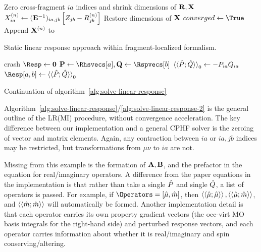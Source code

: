 \documentclass[%
  class = book,%
  crop = false,%
  float = true,%
  multi = true,%
  preview = false,%
]{standalone}
\begin{document}
\begin{algorithm}
\begin{algorithmic}[1]
        \If{\Not{} \AllowCT{}}
          \State Zero cross-fragment \(ia\) indices and shrink dimensions of \(\mathbf{R}, \mathbf{X}\)
        \EndIf
        \State \(X_{ia}^{(n)} \gets (\mathbf{E}^{-1})_{ia,jb} \left[ Z_{jb} - R_{jb}^{(n)} \right]\)
        \If{\Not{} \AllowCT{}}
          \State Restore dimensions of \(\mathbf{X}\)
        \EndIf
          \State \(converged \gets \True\)
          \State Append \(\mathbf{X}^{(n)}\) to \Rspvecs
          \State \Break
        \EndIf
  \end{algorithmic}
  \caption{Static linear response approach within fragment-localized formalism.}
  \label{alg:solve-linear-response}
\end{algorithm}
\begin{algorithm}
  \centering
  \begin{algorithmic}[1]
        \EndFor
        \State crash
      \EndIf
    \EndFor
  \EndFor
  \State \(\Resp \gets \mat{0}\)
      \State \(\mat{P} \gets \Rhsvecs[a], \mat{Q} \gets \Rspvecs[b]\)
      \State \(\braket{\braket{\hat{P}; \hat{Q}}}_{0} \gets -P_{ia}Q_{ia}\)
      \State \(\Resp[a,b] \gets \lr{P}{Q}_{0}\)
    \EndFor
  \EndFor
  \EndProcedure
  \end{algorithmic}
  \caption{Continuation of algorithm~\ref{alg:solve-linear-response}}
  \label{alg:solve-linear-response-2}
\end{algorithm}

Algorithm~\ref{alg:solve-linear-response}/\ref{alg:solve-linear-response-2} is the general outline of the LR(MI) procedure, without convergence acceleration. The key difference between our implementation and a general CPHF solver is the zeroing of vector and matrix elements. Again, any contraction between \(ia\) or \(ia,jb\) indices may be restricted, but transformations from \(\mu\nu\) to \(ia\) are not.

Missing from this example is the formation of \(\mathbf{A}, \mathbf{B}\), and the prefactor in the equation for real/imaginary operators. A difference from the paper equations in the implementation is that rather than take a single \(\hat{P}\) and single \(\hat{Q}\), a list of operators is passed. For example, if \(\Operators = [\op{\mu}, \op{m}]\), then \(\braket{\braket{\hat{\mu}; \hat{\mu}}},\braket{\braket{\hat{\mu}; \hat{m}}}\), and \(\braket{\braket{\hat{m}; \hat{m}}}\) will automatically be formed. Another implementation detail is that each operator carries its own property gradient vectors (the occ-virt MO basis integrals for the right-hand side) and perturbed response vectors, and each operator carries information about whether it is real/imaginary and spin conserving/altering.
\onlyifstandalone{\printbibliography}
\end{document}
